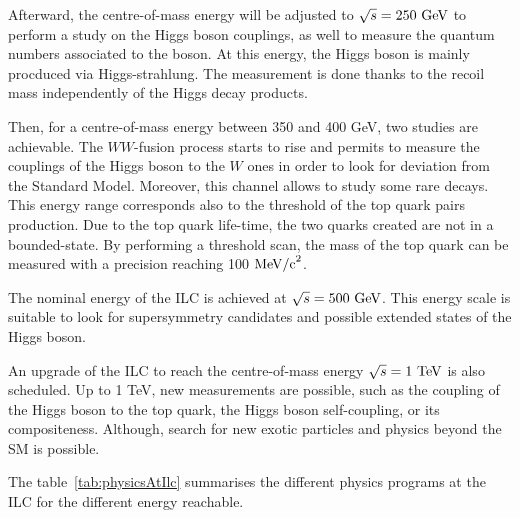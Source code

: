    Afterward, the centre-of-mass energy will be adjusted to $\sqrt{s} = 250~\rm{GeV}$ to perform a study on the Higgs boson couplings, as well to measure the quantum numbers associated to the boson.
   At this energy, the Higgs boson is mainly procduced via Higgs-strahlung.
   The measurement is done thanks to the recoil mass independently of the Higgs decay products.
 
   Then, for a centre-of-mass energy between 350 and 400 GeV, two studies are achievable. 
   The $WW$-fusion process starts to rise and permits to measure the couplings of the Higgs boson to the $W$ ones in order to look for deviation from the Standard Model. 
   Moreover, this channel allows to study some rare decays. 
   This energy range corresponds also to the threshold of the top quark pairs production.
   Due to the top quark life-time, the two quarks created are not in a bounded-state.
   By performing a threshold scan, the mass of the top quark can be measured with a precision reaching 100 $\rm{MeV/c}^2$.

   The nominal energy of the \gls{ILC} is achieved at $\sqrt{s} = 500~\rm{GeV}$.
   This energy scale is suitable to look for supersymmetry candidates and possible extended states of the Higgs boson.

   An upgrade of the ILC to reach the centre-of-mass energy $\sqrt{s} = 1~\rm{TeV}$ is also scheduled.
   Up to 1 TeV, new measurements are possible, such as the coupling of the Higgs boson to the top quark, the Higgs boson self-coupling, or its compositeness.
   Although, search for new exotic particles and physics beyond the \gls{SM} is possible.
    
   The table~\ref{tab:physicsAtIlc} summarises the different physics programs at the \gls{ILC} for the different energy reachable.  

